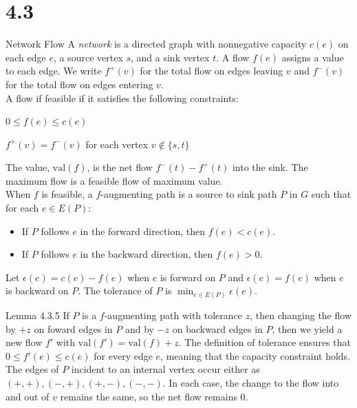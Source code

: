 \documentclass[10pt]{extarticle}
\begin{document}
\section*{4.3}%
  \begin{problem}{Network Flow}
    A \textit{network} is a directed graph with nonnegative capacity $c(e)$ on each edge $e$, a source vertex $s$, and a sink vertex $t$. A flow $f(e)$ assigns a value to each edge. We write $f^+(v)$ for the total flow on edges leaving $v$ and $f^-(v)$ for the total flow on edges entering $v$.\\

    A flow if feasible if it satisfies the following constraints:
    \begin{description}[font=\normalfont\scshape]
      \item[Capacity constraint:] $0\leq f(e) \leq c(e)$
      \item[Conservation constraint:] $f^+(v) = f^-(v)$ for each vertex $v\notin\{s,t\}$
    \end{description}

    The value, $\textrm{val}(f)$, is the net flow $f^-(t) - f^+(t)$ into the sink. The maximum flow is a feasible flow of maximum value.\\

    When $f$ is feasible, a $f$-augmenting path is a source to sink path $P$ in $G$ such that for each $e\in E(P)$:
    \begin{itemize}
      \item If $P$ follows $e$ in the forward direction, then $f(e) < c(e)$.
      \item If $P$ follows $e$ in the backward direction, then $f(e) > 0$.
    \end{itemize}
    Let $\epsilon(e) = c(e) - f(e)$ when $e$ is forward on $P$ and $\epsilon(e) = f(e)$ when $e$ is backward on $P$. The tolerance of $P$ is $\min_{e\in E(P)} \epsilon(e)$.\\
    \begin{problem}{Lemma 4.3.5}
      If $P$ is a $f$-augmenting path with tolerance $z$, then changing the flow by $+z$ on foward edges in $P$ and by $-z$ on backward edges in $P$, then we yield a new flow $f'$ with $\textrm{val}(f') = \textrm{val}(f) + z$.
      \tcblower
      The definition of tolerance ensures that $0 \leq f'(e) \leq c(e)$ for every edge $e$, meaning that the capacity constraint holds.\\

      The edges of $P$ incident to an internal vertex occur either as $(+,+), (-,+),(+,-),(-,-)$. In each case, the change to the flow into and out of $v$ remains the same, so the net flow remains $0$.\\


\end{problem}
\end{problem}
\end{document}
